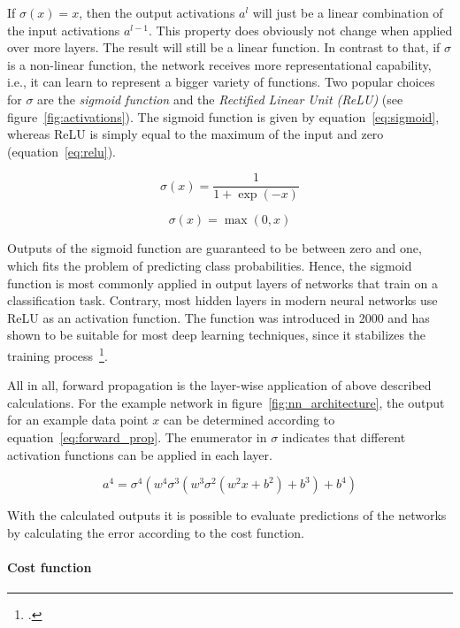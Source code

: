 If $\sigma(x) = x$, then the output activations $a^l$ will just be a linear
combination of the input activations $a^{l-1}$.
This property does obviously not change when applied over more layers.
The result will still be a linear function.
In contrast to that, if $\sigma$ is a non-linear function, the network receives more 
representational capability, i.e., it can learn to represent a bigger variety of 
functions. 
Two popular choices for $\sigma$ are the \textit{sigmoid function} and the
\textit{Rectified Linear Unit (ReLU)} (see figure~\ref{fig:activations}). 
The sigmoid function is given by equation~\ref{eq:sigmoid}, whereas ReLU is 
simply equal to the maximum of the input and zero (equation~\ref{eq:relu}).

\begin{equation}
  \label{eq:sigmoid}
  \sigma(x) = \frac{1}{1 + \exp(-x)}
\end{equation}

\begin{equation}
  \label{eq:relu}
  \sigma(x) = \max(0, x)
\end{equation}

Outputs of the sigmoid function are guaranteed to be between zero and one, which fits
the problem of predicting class probabilities.
Hence, the sigmoid function is most commonly applied in output layers of networks that
train on a classification task.
Contrary, most hidden layers in modern neural networks use ReLU as an activation
function.
The function was introduced in 2000 and has shown to be suitable for most deep
learning techniques, since it stabilizes the training process~\footcite{Hahnioser2000, Nair2010}.

All in all, forward propagation is the layer-wise application of above described
calculations. For the example network in figure~\ref{fig:nn_architecture}, the
output for an example data point $x$ can be determined according to equation~\ref{eq:forward_prop}.
The enumerator in $\sigma$ indicates that different activation functions can
be applied in each layer.

\begin{equation}
  \label{eq:forward_prop}
  a^4 = \sigma^4(w^4 \sigma^3(w^3 \sigma^2(w^2 x + b^2) + b^3) + b^4)
\end{equation}

With the calculated outputs it is possible to evaluate predictions of the
networks by calculating the error according to the cost function.

\paragraph{Cost function}

